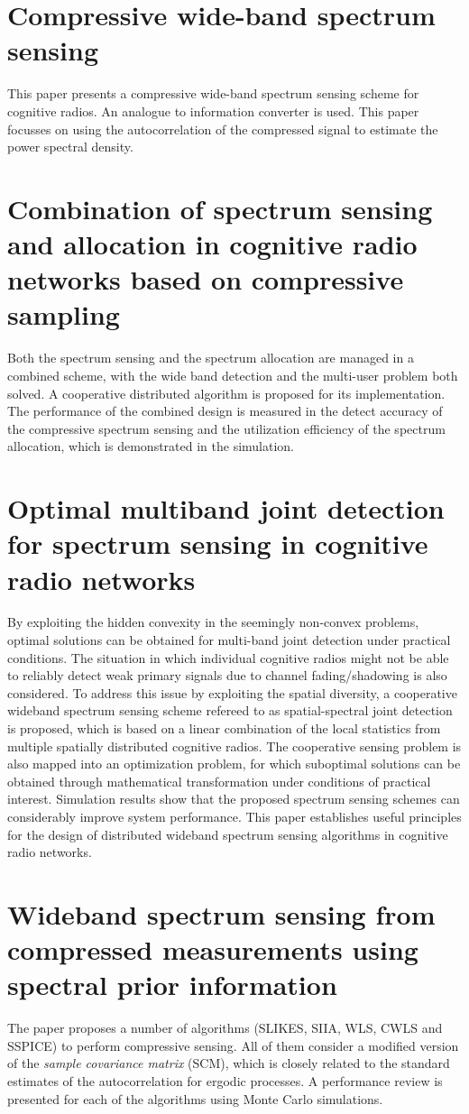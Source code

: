 \documentclass[report, oneside, a4paper, openany]{memoir}
\begin{document}
\section{Compressive wide-band spectrum sensing \cite{polo2009compressive}}
%
This paper presents a compressive wide-band spectrum sensing scheme for cognitive radios. An analogue to information converter is used. This paper focusses on using the autocorrelation of the compressed signal to estimate the power spectral density.
\section{Combination of spectrum sensing and allocation in cognitive radio networks based on compressive sampling \cite{qiao2011combination}}
Both the spectrum sensing and the spectrum allocation are managed in a combined scheme, with the wide band detection and the multi-user problem both solved.
A cooperative distributed algorithm is proposed for its implementation.
The performance of the combined design is measured in the detect accuracy of the compressive spectrum sensing and the utilization efficiency of the spectrum allocation, which is demonstrated in the simulation.
\section{Optimal multiband joint detection for spectrum sensing in cognitive radio networks \cite{quan2009optimal}}
By exploiting the hidden convexity in the seemingly non-convex problems, optimal solutions can be obtained for multi-band joint detection under practical conditions.
The situation in which individual cognitive radios might not be able to reliably detect weak primary signals due to channel fading/shadowing is also considered.
To address this issue by exploiting the spatial diversity, a cooperative wideband spectrum sensing scheme refereed to as spatial-spectral joint detection is proposed, which is based on a linear combination of the local statistics from multiple spatially distributed cognitive radios.
The cooperative sensing problem is also mapped into an optimization problem, for which suboptimal solutions can be obtained through mathematical transformation under conditions of practical interest.
Simulation results show that the proposed spectrum sensing schemes can considerably improve system performance.
This paper establishes useful principles for the design of distributed wideband spectrum sensing algorithms in cognitive radio networks.
\section{Wideband spectrum sensing from compressed measurements using spectral prior information \cite{romero2013wideband}}
The paper proposes a number of algorithms (SLIKES, SIIA, WLS, CWLS and SSPICE) to perform compressive sensing. All of them consider a modified version of the \emph{sample covariance matrix} (SCM), which is closely related to the standard estimates of the autocorrelation for ergodic processes. A performance review is presented for each of the algorithms using Monte Carlo simulations.
\end{document}
